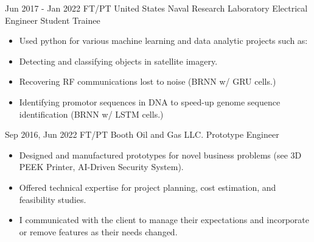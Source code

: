 \documentclass[
	10pt, %
]{FreemanCV}
\begin{document}
\begin{paracol}{2}

\jobentry
	{Jun 2017 - Jan 2022} %
	{FT/PT} %
	{United States Naval Research Laboratory} %
	{Electrical Engineer Student Trainee} %
	{ %
	\vspace{-15pt}
	\begin{itemize}[leftmargin=0pt]
		\item Used python for various machine learning and data analytic projects such as:
		\item Detecting and classifying objects in satellite imagery.
		\item Recovering RF communications lost to noise (BRNN w/ GRU cells.)
		\item Identifying promotor sequences in DNA to speed-up genome sequence identification (BRNN w/ LSTM cells.)
	\end{itemize}
	} 


\jobentry
	{Sep 2016, Jun 2022} %
	{FT/PT} %
	{Booth Oil and Gas LLC.} %
	{Prototype Engineer} %
	{ %
	\vspace{-15pt}
	\begin{itemize}[leftmargin=0pt]
		\item Designed and manufactured prototypes for novel business problems (see 3D PEEK Printer, AI-Driven Security System).
		\item Offered technical expertise for project planning, cost estimation, and feasibility studies.
		\item I communicated with the client to manage their expectations and incorporate or remove features as their needs changed.
	\end{itemize}
	}
	





\end{paracol}
\end{document}
